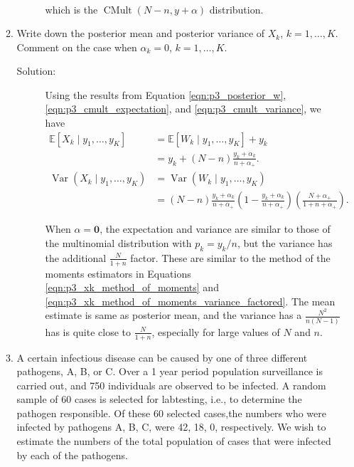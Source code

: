 \documentclass[letterpaper,11pt]{article}
\begin{document}
\begin{enumerate}
\begin{enumerate}
\begin{description}
\begin{align}
          \label{eqn:p3_posterior_w}  
      \end{align}
      which is the $\operatorname{CMult}\left(N - n, y + \alpha\right)$
      distribution.      
    \end{description}
  \item Write down the posterior mean and posterior variance of $X_k$,
    $k= 1,\ldots,K$.  Comment on the case when $\alpha_k = 0$, $k = 1,\ldots,K$.
    \begin{description}
    \item[Solution:] Using the results from Equation \ref{eqn:p3_posterior_w},
      \ref{eqn:p3_cmult_expectation}, and \ref{eqn:p3_cmult_variance}, we have
      \begin{align}
        \mathbb{E}\left[
        X_k \mid y_1,\ldots,y_K
        \right]
        &= \mathbb{E}\left[
          W_k \mid y_1,\ldots,y_K
          \right] + y_k \nonumber\\
        &= y_k + \left(N - n\right)\frac{y_k + \alpha_k}{n + \alpha_+}.
          \label{eqn:p3_posterior_x_expectation} \\
        \operatorname{Var}\left(X_k \mid y_1,\ldots,y_K \right)
        &= \operatorname{Var}\left(W_k \mid y_1,\ldots,y_K \right) \label{eqn:p3_posterior_x_variance}
        \\
        &= \left(N - n\right)\frac{y_k + \alpha_k}{n + \alpha_+}
          \left(1 - \frac{y_k + \alpha_k}{n + \alpha_+}\right)
          \left(\frac{N + \alpha_+}{1 + n + \alpha_+}\right). 
          \nonumber  
      \end{align}

      When $\alpha = \mathbf{0}$, the expectation and variance are similar to
      those of the multinomial distribution with $p_k = y_k/n$, but the variance
      has the additional $\frac{N}{1 + n}$ factor. These are similar to the
      method of the moments estimators in Equations
      \ref{eqn:p3_xk_method_of_moments} and
      \ref{eqn:p3_xk_method_of_moments_variance_factored}. The mean estimate is
      same as posterior mean, and the variance has a
      $\frac{N^2}{n\left(N - 1\right)}$ has is quite close to $\frac{N}{1 + n}$,
      especially for large values of $N$ and $n$.
    \end{description}
  \item A certain infectious disease can be caused by one of three different
    pathogens, A, B, or C. Over a 1 year period population surveillance is
    carried out, and 750 individuals are observed to be infected. A random
    sample of 60 cases is selected for labtesting, i.e., to determine the
    pathogen responsible.  Of these 60 selected cases,the numbers who were
    infected by pathogens A, B, C, were 42, 18, 0, respectively. We wish to
    estimate the numbers of the total population of cases that were infected by
    each of the pathogens.


\end{enumerate}
\end{enumerate}
\end{document}
